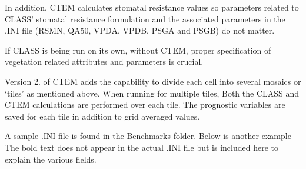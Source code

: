 In addition, C\+T\+E\+M calculates stomatal resistance values so parameters related to C\+L\+A\+S\+S’ stomatal resistance formulation and the associated parameters in the .I\+N\+I file (R\+S\+M\+N, Q\+A50, V\+P\+D\+A, V\+P\+D\+B, P\+S\+G\+A and P\+S\+G\+B) do not matter.

If C\+L\+A\+S\+S is being run on its own, without C\+T\+E\+M, proper specification of vegetation related attributes and parameters is crucial.

Version 2. of C\+T\+E\+M adds the capability to divide each cell into several mosaics or ‘tiles’ as mentioned above. When running for multiple tiles, Both the C\+L\+A\+S\+S and C\+T\+E\+M calculations are performed over each tile. The prognostic variables are saved for each tile in addition to grid averaged values.

A sample .I\+N\+I file is found in the Benchmarks folder. Below is another example The bold text does not appear in the actual .I\+N\+I file but is included here to explain the various fields. 